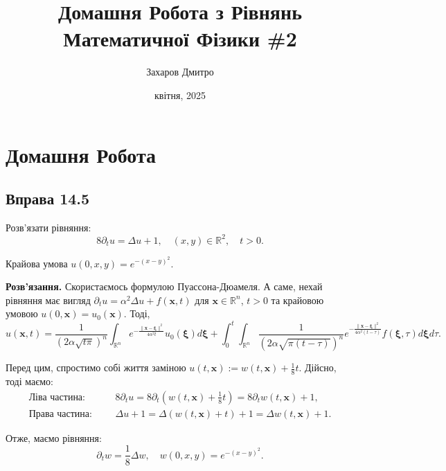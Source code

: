 \documentclass{hw_template}
\title{\huge\sffamily\bfseries Домашня Робота з Рівнянь Математичної Фізики \#2}
\author{\Large\sffamily Захаров Дмитро}
\date{\sffamily 2 квітня, 2025}
\begin{document}
\pagestyle{fancy}

\maketitle

\tableofcontents

\pagebreak

\section{Домашня Робота}

\subsection{Вправа 14.5}

\begin{problem}
    Розв'язати рівняння:
    \begin{equation*}
        8\partial_t u = \Delta u + 1, \quad (x,y) \in \mathbb{R}^2, \quad t > 0.
    \end{equation*}

    Крайова умова $u(0,x,y)=e^{-(x-y)^2}$.
\end{problem}

\textbf{Розв'язання.} Скористаємось формулою Пуассона-Дюамеля. А саме, нехай
рівняння має вигляд $\partial_t u = \alpha^2 \Delta u + f(\mathbf{x},t)$ для 
$\mathbf{x} \in \mathbb{R}^n$, $t>0$ та крайовою умовою $u(0,\mathbf{x})=u_0(\mathbf{x})$. Тоді,
\begin{equation*}
    u(\mathbf{x},t) = \frac{1}{(2\alpha\sqrt{t\pi})^n}\int_{\mathbb{R}^n}e^{-\frac{\|\mathbf{x}-\boldsymbol{\xi}\|^2}{4\alpha^2 t}}u_0(\boldsymbol{\xi})d\boldsymbol{\xi} + \int_0^t \int_{\mathbb{R}^n}\frac{1}{(2\alpha\sqrt{\pi(t-\tau)})^n}e^{-\frac{\|\mathbf{x}-\boldsymbol{\xi}\|^2}{4\alpha^2(t-\tau)}}f(\boldsymbol{\xi},\tau)d\boldsymbol{\xi}d\tau.
\end{equation*}

Перед цим, спростимо собі життя заміною $u(t,\mathbf{x}) :=
w(t,\mathbf{x})+\frac{1}{8}t$. Дійсно, тоді маємо:
\begin{align*}
    \textbf{Ліва частина:} &&& 8\partial_t u = 8\partial_t\left(w(t,\mathbf{x})+\frac{1}{8}t\right) = 8\partial_t w(t,\mathbf{x}) + 1, \\
    \textbf{Права частина:} &&& \Delta u + 1 = \Delta(w(t,\mathbf{x})+t) + 1 = \Delta w(t,\mathbf{x}) + 1.
\end{align*}

Отже, маємо рівняння:
\begin{equation*}
    \partial_t w = \frac{1}{8}\Delta w, \quad w(0,x,y) = e^{-(x-y)^2}.
\end{equation*}
\end{document}
